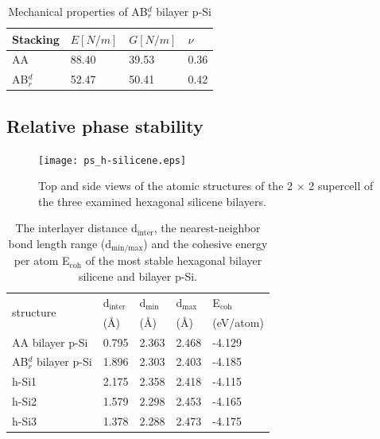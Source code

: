\begin{table}[htbp]
\centering
\caption{Mechanical properties of AB$_r^d$ bilayer p-Si}
\label{mechanical}
\begin{tabularx}{0.6\textwidth}{l|XXX}
\hline\hline
Stacking & $E[N/m]$ & $G[N/m]$ & $\nu$ \\ \hline
AA & 88.40 & 39.53 & 0.36 \\ 
AB$_r^d$ & 52.47 & 50.41 & 0.42  \\ \hline\hline
\end{tabularx}
\end{table}

\subsection{Relative phase stability}\label{hexa}

\begin{figure}[htb]
\centering
\texttt{[image: ps\_h-silicene.eps]}%
\caption{Top and side views of the atomic structures of the 2 $\times$ 2 supercell of the three examined hexagonal silicene bilayers. \label{fig:ps_h-Si}}
\end{figure}

\begin{table}[htb]
\centering
\caption{The interlayer distance d$_{\text{inter}}$, the nearest-neighbor bond length range (d$_{\text{min/max}}$) and the cohesive energy per atom E$_{\text{coh}}$ of the most stable hexagonal bilayer silicene and bilayer p-Si. }
\label{h-Si_table}
\begin{tabularx}{0.9\linewidth}{l|XXXX}
\hline\hline
\multirow{2}{*}{structure}  &   d$_{\text{inter}}$ & d$_{\text{min}}$ & d$_{\text{max}}$ & E$_{\text{coh}}$  \\ 
 &   (\AA) & (\AA) & (\AA) &  (eV/atom) \\
 \hline
AA bilayer p-Si  &  0.795  & 2.363  & 2.468  & -4.129 \\
AB$_r^d$ bilayer p-Si  &  1.896  & 2.303  & 2.403  & -4.185 \\
h-Si1            &  2.175  & 2.358  & 2.418  & -4.115 \\
h-Si2            &  1.579  & 2.298  & 2.453  & -4.165 \\
h-Si3            &  1.378  & 2.288  & 2.473  & -4.175 \\ 
\hline\hline
\end{tabularx}
\end{table}

